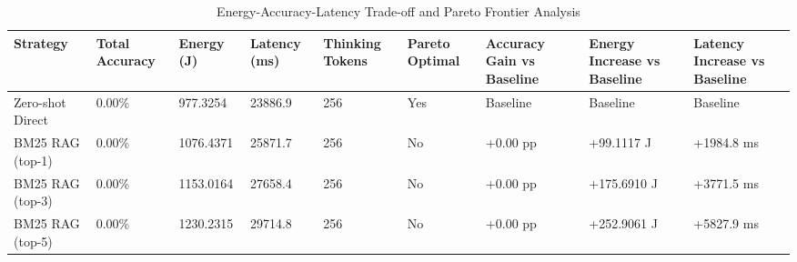 \begin{table}
\caption{Energy-Accuracy-Latency Trade-off and Pareto Frontier Analysis}
\label{tab:tradeoff_comparison}
\begin{tabular}{lllllllll}
\toprule
Strategy & Total Accuracy & Energy (J) & Latency (ms) & Thinking Tokens & Pareto Optimal & Accuracy Gain vs Baseline & Energy Increase vs Baseline & Latency Increase vs Baseline \\
\midrule
Zero-shot Direct & 0.00\% & 977.3254 & 23886.9 & 256 & Yes & Baseline & Baseline & Baseline \\
BM25 RAG (top-1) & 0.00\% & 1076.4371 & 25871.7 & 256 & No & +0.00 pp & +99.1117 J & +1984.8 ms \\
BM25 RAG (top-3) & 0.00\% & 1153.0164 & 27658.4 & 256 & No & +0.00 pp & +175.6910 J & +3771.5 ms \\
BM25 RAG (top-5) & 0.00\% & 1230.2315 & 29714.8 & 256 & No & +0.00 pp & +252.9061 J & +5827.9 ms \\
\bottomrule
\end{tabular}
\end{table}
